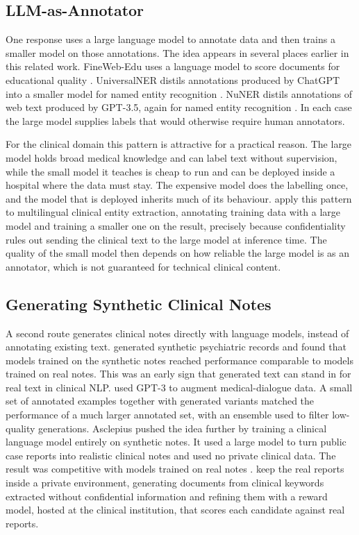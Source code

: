 \subsection{LLM-as-Annotator}

One response uses a large language model to annotate data and then trains a smaller model on
those annotations. The idea appears in several places earlier in this related work. FineWeb-Edu
uses a language model to score documents for educational quality \citep{penedo2024fineweb}.
UniversalNER distils annotations produced by ChatGPT into a smaller model for named entity
recognition \citep{zhou2024universalner}. NuNER distils annotations of web text produced by
GPT-3.5, again for named entity recognition \citep{bogdanov2024nuner}. In each case the large
model supplies labels that would otherwise require human annotators.

For the clinical domain this pattern is attractive for a practical reason. The large model
holds broad medical knowledge and can label text without supervision, while the small model it
teaches is cheap to run and can be deployed inside a hospital where the data must stay. The
expensive model does the labelling once, and the model that is deployed inherits much of its
behaviour. \citet{meoni-etal-2023-large} apply this pattern to multilingual clinical entity
extraction, annotating training data with a large model and training a smaller one on the
result, precisely because confidentiality rules out sending the clinical text to the large
model at inference time. The quality of the small model then depends on how reliable the large
model is as an annotator, which is not guaranteed for technical clinical content.

\subsection{Generating Synthetic Clinical Notes}

A second route generates clinical notes directly with language models, instead of annotating
existing text. \citet{ive2020synthetic} generated synthetic psychiatric records and found
that models trained on the synthetic notes reached performance comparable to models trained on
real notes. This was an early sign that generated text can stand in for real text in clinical
NLP. \citet{chintagunta2021} used GPT-3 to augment medical-dialogue data. A small set of
annotated examples together with generated variants matched the performance of a much larger
annotated set, with an ensemble used to filter low-quality generations. Asclepius pushed the
idea further by training a clinical language model entirely on synthetic notes. It used a large
model to turn public case reports into realistic clinical notes and used no private clinical
data. The result was competitive with models trained on real notes \citep{kweon2024asclepius}.
\citet{meoni-etal-2024-generating} keep the real reports inside a private environment, generating
documents from clinical keywords extracted without confidential information and refining them
with a reward model, hosted at the clinical institution, that scores each candidate against real reports.

